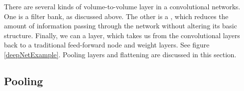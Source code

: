 There are several kinds of volume-to-volume layer in a convolutional networks.  One is a filter bank, as discussed above. The other is a , which reduces the amount of information passing through the network without altering its basic structure. Finally, we can  a layer, which takes us from the convolutional layers back to a traditional feed-forward  node and weight layers.  See figure \ref{deepNetExample}. Pooling layers and flattening are discussed in this section.



\subsection{Pooling}


